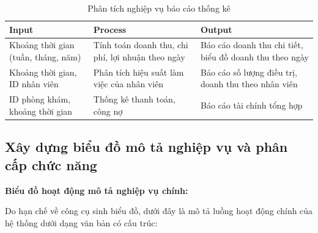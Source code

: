 \begin{table}[h]
\centering
\caption{Phân tích nghiệp vụ báo cáo thống kê}
\begin{tabular}{|p{4cm}|p{5cm}|p{4.5cm}|}
\hline
\textbf{Input} & \textbf{Process} & \textbf{Output} \\
\hline
Khoảng thời gian (tuần, tháng, năm) & Tính toán doanh thu, chi phí, lợi nhuận theo ngày & Báo cáo doanh thu chi tiết, biểu đồ doanh thu theo ngày \\
\hline
Khoảng thời gian, ID nhân viên & Phân tích hiệu suất làm việc của nhân viên & Báo cáo số lượng điều trị, doanh thu theo nhân viên \\
\hline
ID phòng khám, khoảng thời gian & Thống kê thanh toán, công nợ & Báo cáo tài chính tổng hợp \\
\hline
\end{tabular}
\end{table}

\subsection{Xây dựng biểu đồ mô tả nghiệp vụ và phân cấp chức năng}

\textbf{Biểu đồ hoạt động mô tả nghiệp vụ chính:}

Do hạn chế về công cụ sinh biểu đồ, dưới đây là mô tả luồng hoạt động chính của hệ thống dưới dạng văn bản có cấu trúc:


